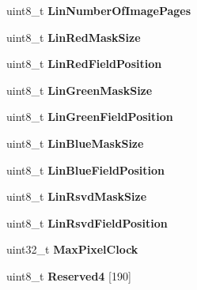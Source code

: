 \begin{DoxyCompactItemize}
\item 
\hypertarget{group__vbe_ga3fa2352e69836f4b69b3a344ae761ba8}{}uint8\+\_\+t {\bfseries Lin\+Number\+Of\+Image\+Pages}\label{group__vbe_ga3fa2352e69836f4b69b3a344ae761ba8}

\item 
\hypertarget{group__vbe_ga1fbcef2402fe6ce7f6c006bd50eaa6da}{}uint8\+\_\+t {\bfseries Lin\+Red\+Mask\+Size}\label{group__vbe_ga1fbcef2402fe6ce7f6c006bd50eaa6da}

\item 
\hypertarget{group__vbe_gaff962b58f86a77f12b412d47125a4993}{}uint8\+\_\+t {\bfseries Lin\+Red\+Field\+Position}\label{group__vbe_gaff962b58f86a77f12b412d47125a4993}

\item 
\hypertarget{group__vbe_gaf235e505028771ab2fb84778f4dfb476}{}uint8\+\_\+t {\bfseries Lin\+Green\+Mask\+Size}\label{group__vbe_gaf235e505028771ab2fb84778f4dfb476}

\item 
\hypertarget{group__vbe_ga6683a63711dbc5dfb9a2a59c55deecd5}{}uint8\+\_\+t {\bfseries Lin\+Green\+Field\+Position}\label{group__vbe_ga6683a63711dbc5dfb9a2a59c55deecd5}

\item 
\hypertarget{group__vbe_gad8a25cec803bf91fb40a20a0aa5d5bf7}{}uint8\+\_\+t {\bfseries Lin\+Blue\+Mask\+Size}\label{group__vbe_gad8a25cec803bf91fb40a20a0aa5d5bf7}

\item 
\hypertarget{group__vbe_ga3f38d6becbe961786cd7ab58ec37fc07}{}uint8\+\_\+t {\bfseries Lin\+Blue\+Field\+Position}\label{group__vbe_ga3f38d6becbe961786cd7ab58ec37fc07}

\item 
\hypertarget{group__vbe_ga334886fc9a915ff91966c3aac1da586a}{}uint8\+\_\+t {\bfseries Lin\+Rsvd\+Mask\+Size}\label{group__vbe_ga334886fc9a915ff91966c3aac1da586a}

\item 
\hypertarget{group__vbe_ga3df070e698b5f54814e20c8813f7bf7e}{}uint8\+\_\+t {\bfseries Lin\+Rsvd\+Field\+Position}\label{group__vbe_ga3df070e698b5f54814e20c8813f7bf7e}

\item 
\hypertarget{group__vbe_gab1fbd72846963ebb34a308a7edf7bbe1}{}uint32\+\_\+t {\bfseries Max\+Pixel\+Clock}\label{group__vbe_gab1fbd72846963ebb34a308a7edf7bbe1}

\item 
\hypertarget{group__vbe_ga2e13c4795a00241b919aa3aab86560ce}{}uint8\+\_\+t {\bfseries Reserved4} \mbox{[}190\mbox{]}\label{group__vbe_ga2e13c4795a00241b919aa3aab86560ce}


\end{DoxyCompactItemize}
